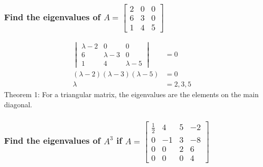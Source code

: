 \documentclass[
  letterpaper,
  DIV=11,
  numbers=noendperiod]{scrartcl}
\begin{document}
\newpage{}

\hypertarget{find-the-eigenvalues-of-a-beginbmatrix2-0-0-6-3-0-1-4-5-endbmatrix}{%
\subsubsection{\texorpdfstring{Find the eigenvalues of
\(A = \begin{bmatrix}2 & 0 & 0 \\ 6 & 3 & 0 \\ 1 & 4 & 5 \end{bmatrix}\)}{Find the eigenvalues of A = \textbackslash begin\{bmatrix\}2 \& 0 \& 0 \textbackslash\textbackslash{} 6 \& 3 \& 0 \textbackslash\textbackslash{} 1 \& 4 \& 5 \textbackslash end\{bmatrix\}}}\label{find-the-eigenvalues-of-a-beginbmatrix2-0-0-6-3-0-1-4-5-endbmatrix}}

\begin{align*}
\begin{vmatrix}\lambda-2 & 0 & 0 \\ 6 & \lambda-3 & 0 \\ 1 & 4 & \lambda-5\end{vmatrix} &= 0 \\
(\lambda-2)(\lambda-3)(\lambda-5) &= 0 \\
\lambda &= 2, 3, 5
\end{align*} Theorem 1: For a triangular matrix, the eigenvalues are the
elements on the main diagonal.

\hypertarget{find-the-eigenvalues-of-a3-if-abeginbmatrixfrac12-4-5--2-0--1-3--8-0-0-2-6-0-0-0-4endbmatrix}{%
\subsubsection{\texorpdfstring{Find the eigenvalues of \(A^3\) if
\(A=\begin{bmatrix}\frac{1}{2} & 4 & 5 & -2 \\ 0 & -1 & 3 & -8 \\ 0 & 0 & 2 & 6 \\ 0 & 0 & 0 & 4\end{bmatrix}\)}{Find the eigenvalues of A\^{}3 if A=\textbackslash begin\{bmatrix\}\textbackslash frac\{1\}\{2\} \& 4 \& 5 \& -2 \textbackslash\textbackslash{} 0 \& -1 \& 3 \& -8 \textbackslash\textbackslash{} 0 \& 0 \& 2 \& 6 \textbackslash\textbackslash{} 0 \& 0 \& 0 \& 4\textbackslash end\{bmatrix\}}}\label{find-the-eigenvalues-of-a3-if-abeginbmatrixfrac12-4-5--2-0--1-3--8-0-0-2-6-0-0-0-4endbmatrix}}
\end{document}
